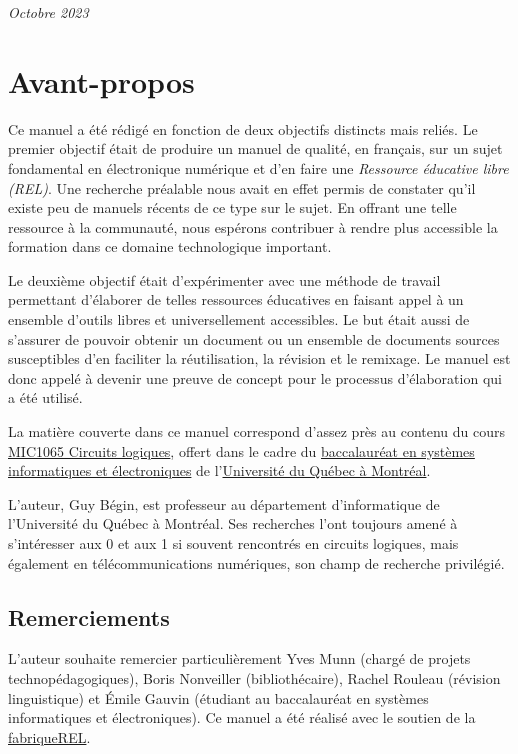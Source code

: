 \documentclass[letter, oneside]{book}
\begin{document}
\noindent \textit{Octobre 2023} %

\chapter*{Avant-propos}
\label{sec:org5605d4a}
Ce manuel a été rédigé en fonction de deux objectifs distincts mais
reliés. Le premier objectif était de produire un manuel de qualité, en
français, sur un sujet fondamental en électronique numérique et d'en
faire une \emph{Ressource éducative libre (REL)}. Une recherche préalable
nous avait en effet permis de constater qu'il existe peu de manuels
récents de ce type sur le sujet. En offrant une telle ressource à la
communauté, nous espérons contribuer à rendre plus accessible la
formation dans ce domaine technologique important.

Le deuxième objectif était d'expérimenter avec une méthode de
travail permettant d'élaborer de telles ressources éducatives en
faisant appel à un ensemble d'outils libres et universellement accessibles. Le
but était aussi de s'assurer de pouvoir obtenir un document ou un ensemble de
documents sources susceptibles d'en faciliter la réutilisation, la
révision et le remixage. Le manuel est donc appelé à devenir une
preuve de concept pour le processus d'élaboration qui a été utilisé.

La matière couverte dans ce manuel correspond d'assez près au contenu
du cours \href{https://etudier.uqam.ca/cours?sigle=MIC1065}{MIC1065 Circuits logiques}, offert dans le cadre du
\href{https://etudier.uqam.ca/programme?code=6526}{baccalauréat en systèmes informatiques et électroniques} de
l'\href{https://uqam.ca/}{Université du Québec à Montréal}. 

L'auteur, Guy Bégin, est professeur au département d'informatique de
l'Université du Québec à Montréal. Ses recherches l'ont toujours amené
à s'intéresser aux 0 et aux 1 si souvent rencontrés en circuits
logiques, mais également en télécommunications numériques, son champ
de recherche privilégié.

\section*{Remerciements}
\label{sec:org7645a87}

L'auteur souhaite remercier particulièrement Yves Munn (chargé de
projets technopédagogiques), Boris Nonveiller (bibliothécaire), Rachel
Rouleau (révision linguistique) et Émile Gauvin (étudiant au
baccalauréat en systèmes informatiques et électroniques). Ce manuel a
été réalisé avec le soutien de la \href{https://fabriquerel.org/}{fabriqueREL}.
\end{document}
